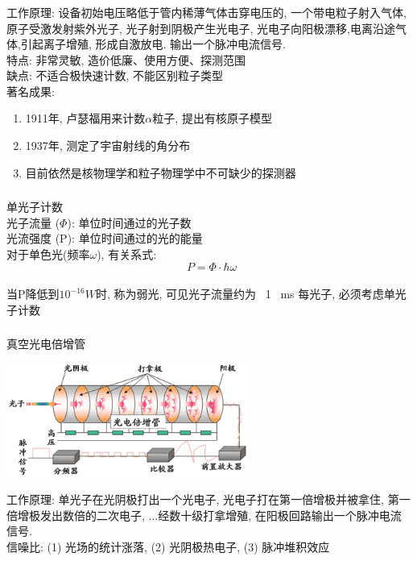 \begin{frame}
 \frametitle{}
 工作原理: 设备初始电压略低于管内稀薄气体击穿电压的, 一个带电粒子射入气体, 原子受激发射紫外光子, 光子射到阴极产生光电子, 光电子向阳极漂移,电离沿途气体,引起离子增殖, 形成自激放电. 输出一个脉冲电流信号.\\  {\vspace*{0.6em}}
      特点: 非常灵敏, 造价低廉、使用方便、探测范围 \\ 
      缺点: 不适合极快速计数, 不能区别粒子类型 \\ 
      著名成果: \\ 
      \begin{enumerate}
          \item 1911年, 卢瑟福用来计数$\alpha$粒子, 提出有核原子模型
          \item 1937年, 测定了宇宙射线的角分布
          \item 目前依然是核物理学和粒子物理学中不可缺少的探测器 
      \end{enumerate}
\end{frame}

\begin{frame}
 \frametitle{}
    {\Bullet} 单光子计数\\  {\vspace*{0.6em}}
    光子流量 ($\varPhi $): 单位时间通过的光子数 \\  光流强度 (P): 单位时间通过的光的能量 \\ 
    对于单色光(频率$\omega $), 有关系式:
    $$ ~~P = \varPhi  \cdot \hbar \omega  $$ \\ 
    当P降低到$10^{-16} W $时, 称为弱光, 可见光子流量约为 ~1~ ms 每光子, 必须考虑单光子计数
\end{frame}

\begin{frame}
      \frametitle{}
      {\Bullet} 真空光电倍增管\\ 
      \begin{center}
           \includegraphics[width=0.6\textwidth]{figs/2022-05-04-16-57-37.png}
      \end{center}
      工作原理: 单光子在光阴极打出一个光电子, 光电子打在第一倍增极并被拿住, 第一倍增极发出数倍的二次电子, ...经数十级打拿增殖, 在阳极回路输出一个脉冲电流信号.  \\ {\vspace*{0.6em}}
    信噪比: (1) 光场的统计涨落, (2) 光阴极热电子, (3) 脉冲堆积效应
\end{frame}

